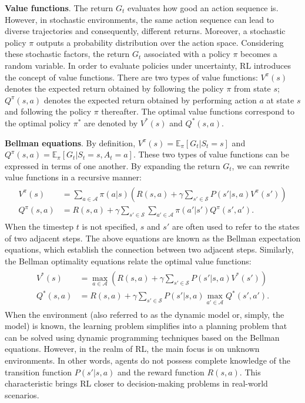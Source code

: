 \documentclass[10pt]{article} %
\theoremstyle{definition}
\begin{document}
\textbf{Value functions}. The return $G_t$ evaluates how good an action sequence is. However, in stochastic environments, the same action sequence can lead to diverse trajectories and consequently, different returns. Moreover, a stochastic policy $\pi$ outputs a probability distribution over the action space. Considering these stochastic factors, the return $G_t$ associated with a policy $\pi$ becomes a random variable.  In order to evaluate policies under uncertainty, RL introduces the concept of value functions. There are two types of value functions: $V^{\pi}(s)$ denotes the expected return obtained by following the policy $\pi$ from state $s$; $Q^{\pi}(s,a)$ denotes the expected return obtained by performing action $a$ at state $s$ and following the policy $\pi$ thereafter. The optimal value functions correspond to the optimal policy $\pi^*$ are denoted by $V^{*}(s)$ and $Q^{*}(s,a)$.

\textbf{Bellman equations}. By definition, $V^{\pi}(s) = \mathbb{E}_{\pi}[G_t | S_t=s]$ and $Q^{\pi}(s,a) = \mathbb{E}_{\pi}[G_t | S_t=s, A_t=a]$. These two types of value functions can be expressed in terms of one another. By expanding the return $G_t$, we can rewrite value functions in a recursive manner:
\begin{align}
\begin{split}
V^{\pi}(s) &= \sum_{a \in \mathcal{A}}\pi(a|s)\left(R(s,a)+\gamma\sum_{s'\in \mathcal{S}} P(s'|s,a)V^{\pi}(s')\right)\\
Q^{\pi}(s,a) &= R(s,a)+\gamma\sum_{s'\in\mathcal{S}}\sum_{a'\in\mathcal{A}}\pi(a'|s')Q^{\pi}(s',a').
\end{split}
\end{align}
When the timestep $t$ is not specified, $s$ and $s'$ are often used to refer to the states of two adjacent steps. The above equations are known as the Bellman expectation equations, which establish the connection between two adjacent steps. Similarly, the Bellman optimality equations relate the optimal value functions:
\begin{align}
\begin{split}
V^{*}(s) &= \max_{a\in\mathcal{A}}\left( R(s,a)+\gamma\sum_{s'\in \mathcal{S}} P(s'|s,a)V^{*}(s')\right)\\
Q^{*}(s,a) &= R(s,a)+\gamma\sum_{s'\in\mathcal{S}}P(s'|s,a)\max_{a'\in\mathcal{A}}Q^{*}(s',a').
\end{split}
\end{align}
When the environment (also referred to as the dynamic model or, simply, the model) is known, the learning problem simplifies into a planning problem that can be solved using dynamic programming techniques based on the Bellman equations. However, in the realm of RL, the main focus is on unknown environments. In other words, agents do not possess complete knowledge of the transition function $P(s'|s, a)$ and the reward function $R(s, a)$. This characteristic brings RL closer to decision-making problems in real-world scenarios.
\end{document}
